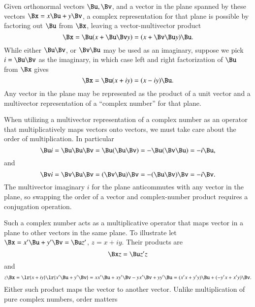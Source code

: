 
Given orthonormal vectors \( \Bu, \Bv \), and a vector in the plane spanned by these vectors \( \Bx = x \Bu + y \Bv \), a complex
representation for that plane is possible by factoring out \( \Bu \) from \( \Bx \), leaving a vector-multivector product
\begin{dmath}\label{eqn:complex:3330}
\Bx = \Bu( x + \Bu \Bv y )
    = ( x + \Bv \Bu y ) \Bu.
\end{dmath}
While either \( \Bu \Bv \), or \( \Bv \Bu \) may be used as an imaginary, suppose we pick \( i = \Bu \Bv \) as the imaginary, in which case
left and right factorization of \( \Bu \) from \( \Bx \) gives
\begin{equation}\label{eqn:complex:3350}
\Bx = \Bu ( x + i y )
    = ( x - i y ) \Bu.
\end{equation}
Any vector in the plane may be represented as the product of a unit vector and a multivector representation of a ``complex number'' for that plane.

When utilizing a multivector representation of a complex number as an operator that multiplicatively maps vectors onto vectors, we must take care about the order of multiplication.  In particular
\begin{dmath}\label{eqn:complex:3410}
\Bu i
= \Bu \Bu \Bv
= \Bu (\Bu \Bv)
= -\Bu (\Bv \Bu)
= -i \Bu,
\end{dmath}
and
\begin{dmath}\label{eqn:complex:3430}
\Bv i
= \Bv \Bu \Bv
= (\Bv \Bu) \Bv
= -(\Bu \Bv) \Bv
= -i \Bv.
\end{dmath}
The multivector imaginary \( i \) for the plane anticommutes with any vector in the plane, so swapping the order of a vector and complex-number product requires a conjugation operation.

Such a complex number acts as a multiplicative operator that maps vector in a plane to other vectors in the same plane.
To illustrate let \( \Bx = x' \Bu + y' \Bv = \Bu z' \), \( z = x + i y \).  Their products are
\begin{dmath}\label{eqn:complex:3370}
\Bx z
= \Bu z' z
\end{dmath}
and
\begin{dmath}\label{eqn:complex:3390}
z \Bx
=
\lr{ x + i y }
\lr{ x' \Bu + y' \Bv }
=
x x' \Bu + x y' \Bv
- y x' \Bv + y y' \Bu
=  (x' x + y' y) \Bu + ( - y' x + x' y ) \Bv.
\end{dmath}
Either such product maps the vector to another vector.  Unlike multiplication of pure complex numbers, order matters

